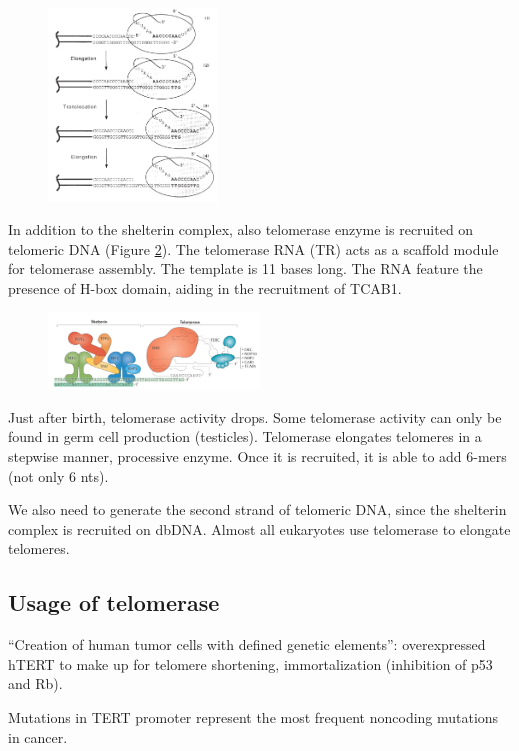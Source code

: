 \begin{figure}
\centering
\includegraphics[width=0.4\textwidth]{../_resources/Screen_Shot_2022-12-15_at_22-58-03.png}
\caption{}
\label{fig:temp}
\end{figure}

In addition to the shelterin complex, also telomerase enzyme is
recruited on telomeric DNA (Figure \ref{fig:recr}). The telomerase RNA (TR) acts as a scaffold
module for telomerase assembly. The template is 11 bases long. The RNA
feature the presence of H-box domain, aiding in the recruitment of
TCAB1.

\begin{figure}
\centering
\includegraphics[width=0.5\textwidth]{../_resources/Screen_Shot_2022-12-15_at_22-58-28.png}
\caption{}
\label{fig:recr}
\end{figure}

Just after birth, telomerase activity drops. Some telomerase activity
can only be found in germ cell production (testicles). Telomerase
elongates telomeres in a stepwise manner, processive enzyme. Once it is
recruited, it is able to add 6-mers (not only 6 nts).

We also need to generate the second strand of telomeric DNA, since the
shelterin complex is recruited on dbDNA. Almost all eukaryotes use
telomerase to elongate telomeres.

\hypertarget{usage-of-telomerase}{%
\subsection{Usage of telomerase}\label{usage-of-telomerase}}

``Creation of human tumor cells with defined genetic elements'':
overexpressed hTERT to make up for telomere shortening, immortalization
(inhibition of p53 and Rb).

Mutations in TERT promoter represent the most frequent noncoding
mutations in cancer.
